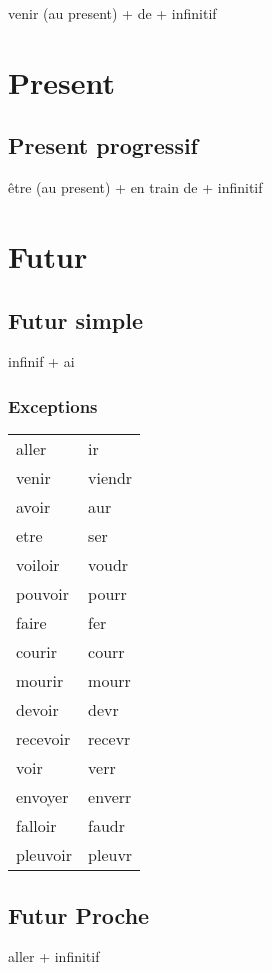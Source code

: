 \documentclass[11pt]{article}
\begin{document}
venir (au present) + de + infinitif

\section{Present}
\label{sec-2}

\subsection{Present progressif}
\label{sec-2-1}

être (au present) + en train de + infinitif

\section{Futur}
\label{sec-3}

\subsection{Futur simple}
\label{sec-3-1}

infinif + ai

\subsubsection{Exceptions}
\label{sec-3-1-1}

\begin{center}
\begin{tabular}{ll}
aller & ir\\
venir & viendr\\
avoir & aur\\
etre & ser\\
voiloir & voudr\\
pouvoir & pourr\\
faire & fer\\
courir & courr\\
mourir & mourr\\
devoir & devr\\
recevoir & recevr\\
voir & verr\\
envoyer & enverr\\
falloir & faudr\\
pleuvoir & pleuvr\\
\end{tabular}
\end{center}

\subsection{Futur Proche}
\label{sec-3-2}

aller + infinitif
\end{document}
